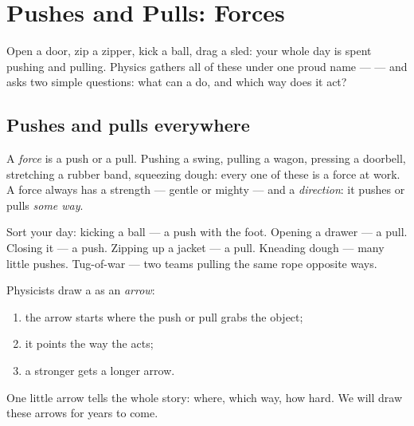 \chapter{Pushes and Pulls: Forces}\label{ch:g2:pushes-and-pulls}

Open a door, zip a zipper, kick a ball, drag a sled: your whole day
is spent pushing and pulling. Physics gathers all of these under one
proud name ---  --- and asks two simple questions: what can a
 do, and which way does it act?

\section{Pushes and pulls everywhere}

\begin{definition}[Force]\label{def:g2:pushes-and-pulls:force}
A \emph{force} is a push or a pull. Pushing a swing,
pulling a wagon, pressing a doorbell, stretching a rubber band,
squeezing dough: every one of these is a force at work. A force
always has a strength --- gentle or mighty --- and a
\emph{direction}: it pushes or pulls \emph{some way}.
\end{definition}

\begin{example}\label{ex:g2:pushes-and-pulls:sort}
Sort your day: kicking a ball --- a push with the foot. Opening a
drawer --- a pull. Closing it --- a push. Zipping up a jacket --- a
pull. Kneading dough --- many little pushes. Tug-of-war --- two
teams pulling the same rope opposite ways.
\end{example}

\begin{method}\label{met:g2:pushes-and-pulls:arrow}
Physicists draw a  as an \emph{arrow}:
\begin{enumerate}
  \item the arrow starts where the push or pull grabs the object;
  \item it points the way the  acts;
  \item a stronger  gets a longer arrow.
\end{enumerate}
One little arrow tells the whole story: where, which way, how hard.
We will draw these arrows for years to come.
\end{method}

